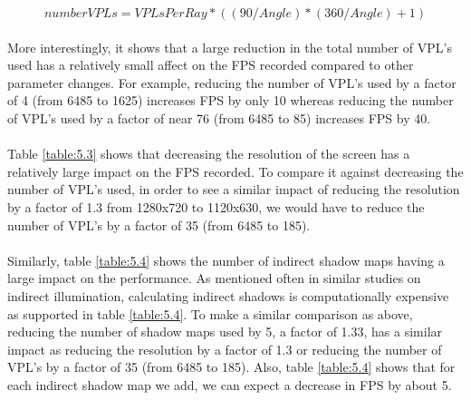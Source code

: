 \begin{equation}
numberVPLs = VPLsPerRay*((90/Angle)*(360/Angle)+1)
\label{eqn:calcVPLtotal}
\end{equation}

\paragraph{}
More interestingly, it shows that a large reduction in the total number of VPL's used has a relatively small affect on the FPS recorded compared to other parameter changes.  For example, reducing the number of VPL's used by a factor of 4 (from 6485 to 1625) increases FPS by only 10 whereas reducing the number of VPL's used by a factor of near 76 (from 6485 to 85) increases FPS by 40.

\paragraph{}
Table \ref{table:5.3} shows that decreasing the resolution of the screen has a relatively large impact on the FPS recorded.  To compare it against decreasing the number of VPL's used, in order to see a similar impact of reducing the resolution by a factor of 1.3 from 1280x720 to 1120x630, we would have to reduce the number of VPL's by a factor of 35 (from 6485 to 185).

\paragraph{}
Similarly, table \ref{table:5.4} shows the number of indirect shadow maps having a large impact on the performance.  As mentioned often in similar studies on indirect illumination, calculating indirect shadows is computationally expensive as supported in table \ref{table:5.4}.  To make a similar comparison as above, reducing the number of shadow maps used by 5, a factor of 1.33, has a similar impact as reducing the resolution by a factor of 1.3 or reducing the number of VPL's by a factor of 35 (from 6485 to 185).  Also, table \ref{table:5.4} shows that for each indirect shadow map we add, we can expect a decrease in FPS by about 5.

